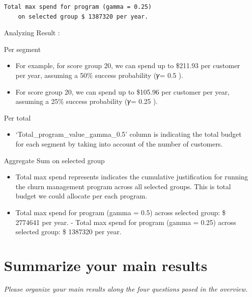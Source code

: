 \documentclass[
]{article}
\providecommand{\tightlist}{%
  \setlength{\itemsep}{0pt}\setlength{\parskip}{0pt}}
\begin{document}
\begin{verbatim}
Total max spend for program (gamma = 0.25) 
    on selected group $ 1387320 per year. 
\end{verbatim}

Analyzing Result :

Per segment

\begin{itemize}
\tightlist
\item
  For example, for score group 20, we can spend up to \$211.93 per
  customer per year, assuming a 50\% success probability (𝛾= 0.5 ).
\item
  For score group 20, we can spend up to \$105.96 per customer per year,
  assuming a 25\% success probability (𝛾= 0.25 ).
\end{itemize}

Per total

\begin{itemize}
\tightlist
\item
  `Total\_program\_value\_gamma\_0.5' column is indicating the total
  budget for each segment by taking into account of the number of
  customers.
\end{itemize}

Aggregate Sum on selected group

\begin{itemize}
\tightlist
\item
  Total max spend represents indicates the cumulative justification for
  running the churn management program across all selected groups. This
  is total budget we could allocate per each program.
\item
  Total max spend for program (gamma = 0.5) across selected group: \$
  2774641 per year. - Total max spend for program (gamma = 0.25) across
  selected group: \$ 1387320 per year.
\end{itemize}

\newpage

\section{Summarize your main results}\label{summarize-your-main-results}

\emph{Please organize your main results along the four questions posed
in the overview.}
\end{document}
